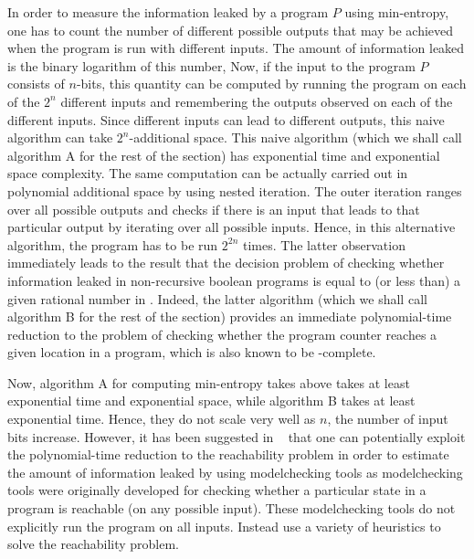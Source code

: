  
 

In order to measure the information leaked by a program $P$ using min-entropy, one has to count the number of different possible outputs that may be achieved when the program is run with different inputs. The amount of information leaked is the binary logarithm of this number, 
Now, if the  input to the program $P$ consists of $n$-bits, this quantity can be computed by running the program on each of the  $2^n$ different inputs and remembering the outputs observed on each of the different inputs.  Since different inputs can lead to different outputs, this naive algorithm can take $2^n$-additional space.
This naive algorithm (which we shall call algorithm A for the rest of the section) has exponential time and exponential space complexity.  The same computation can be actually carried out in polynomial additional space by using nested iteration.
The outer iteration ranges over  all possible outputs and checks if there is an input that leads to that particular output by iterating over all possible inputs. Hence, in this alternative algorithm, the program has to be run $2^{2n}$ times.  The latter observation  immediately leads to the result that  the decision problem of checking whether information leaked  in non-recursive boolean programs is  equal to (or less than) a given rational number in {\PSpace}. Indeed, the latter algorithm (which we shall call algorithm B for the rest of the section)  provides an immediate polynomial-time reduction to the problem of checking whether the program counter reaches a given location in a program, which is also known to be {\PSpace}-complete.  


Now,  algorithm A for computing min-entropy takes above takes  at least exponential time and exponential space, while  algorithm B takes at least exponential time. Hence, they do not scale
very well  as $n$, the number of input bits increase.  However, it has been suggested in 
~\cite{POST} that one can potentially exploit the polynomial-time reduction to the reachability problem in order to estimate the amount of information leaked by using modelchecking tools as modelchecking tools were originally developed for checking whether a particular state in a program is reachable (on any possible input). These modelchecking tools do not explicitly run the program on all inputs. Instead use a variety of heuristics to solve the reachability problem. 


